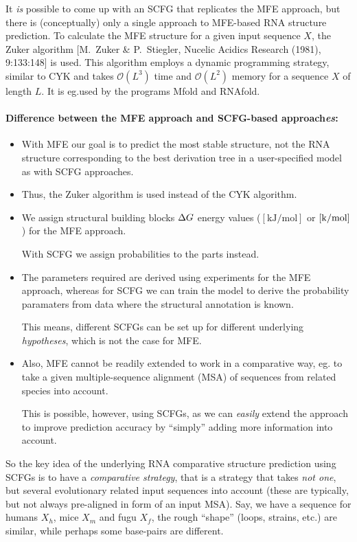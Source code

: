It \emph{is} possible to come up with an SCFG that replicates the MFE approach,
but there is (conceptually) only a single approach to MFE-based RNA structure
prediction. To calculate the MFE structure for a given input sequence \(X\),
the Zuker algorithm [M.~Zuker \& P.~Stiegler, Nucelic Acidics Research (1981),
9:133:148] is used.  This algorithm employs a dynamic programming strategy,
similar to CYK and takes \(\mathcal{O}(L^3)\) time and \(\mathcal{O}(L^2)\)
memory for a sequence \(X\) of length \(L\).  It is eg.\@ used by the programs
Mfold and RNAfold.

\paragraph{Difference between the MFE approach and SCFG-based approach\emph{es}:}
\begin{itemize}
\item With MFE our goal is to predict the most stable structure, not the
  RNA structure corresponding to the best derivation tree in a user-specified
  model as with SCFG approaches.
\item Thus, the Zuker algorithm is used instead of the CYK algorithm.
\item We assign structural building blocks \(\Delta G\) energy values
  (\([\si{\kilo\joule\per\mole}]\) or \([\si{\kilo\cal\per\mole}]\)) for the
  MFE approach.

  With SCFG we assign probabilities to the parts instead.
\item The parameters required are derived using experiments for the MFE
  approach, whereas for SCFG we can train the model to derive the probability
  paramaters from data where the structural annotation is known.

  This means, different SCFGs can be set up for different underlying
  \emph{hypotheses}, which is not the case for MFE\@.
\item Also, MFE cannot be readily extended to work in a comparative way, eg.\@
  to take a given multiple-sequence alignment (MSA) of sequences from related
  species into account.

  This is possible, however, using SCFGs, as we can \emph{easily} extend the
  approach to improve prediction accuracy by \enquote{simply} adding more
  information into account.
\end{itemize}

So the key idea of the underlying RNA comparative structure prediction using
SCFGs is to have a \emph{comparative strategy}, that is a strategy that takes
\emph{not one}, but several evolutionary related input sequences into account
(these are typically, but not always pre-aligned in form of an input MSA).
Say, we have a sequence for humans \(X_h\), mice \(X_m\) and fugu \(X_f\), the
rough \enquote{shape} (loops, strains, etc.\@) are similar, while perhaps some
base-pairs are different.


